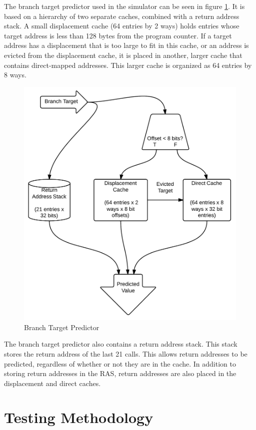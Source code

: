 \documentclass[twocolumn]{article}
\newcommand{\centerimage}[3]{
\begin{figure}[ht!]  
\begin{center}
#1
\caption{#2}
\label{#3}
\end{center}
\end{figure}}
\begin{document}
The branch target predictor used in the simulator can be seen in
figure \ref{btbshape}. It is based on a hierarchy of two separate
caches, combined with a return address stack. A small displacement
cache (64 entries by 2 ways) holds entries whose target address is
less than 128 bytes from the program counter. If a target address has
a displacement that is too large to fit in this cache, or an address
is evicted from the displacement cache, it is placed in another,
larger cache that contains direct-mapped addresses. This larger cache
is organized as 64 entries by 8 ways.

\centerimage{\includegraphics[width=\columnwidth]{BTB.png}}{Branch
  Target Predictor}{btbshape}

The branch target predictor also contains a return address stack. This
stack stores the return address of the last 21 calls. This allows
return addresses to be predicted, regardless of whether or not they
are in the cache. In addition to storing return addresses in the RAS,
return addresses are also placed in the displacement and direct
caches.

\section{Testing Methodology}
\end{document}
